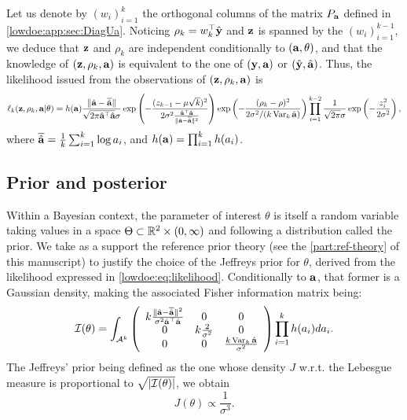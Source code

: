 Let us denote by $(w_i)_{i=1}^k$ the orthogonal columns of the matrix $P_{\mathbf{a}}$ defined in \cref{lowdoe:app:sec:DiagUa}. Noticing $\rho_k = w_k^{\top}\hat{\mathbf{y}}$ and $\mathbf{z}$ is spanned by the $(w_{i})_{i=1}^{k-1}$, we deduce that $\mathbf{z}$ and $\rho_k$ are independent conditionally to $(\mathbf{a}, \theta)$, and that the knowledge of $(\mathbf{z},\rho_k,\mathbf{a})$ is equivalent to the one of $(\mathbf{y},\mathbf{a})$ or $(\hat{\mathbf{y}},\hat{\mathbf{a}})$.
Thus, the likelihood issued from the observations of $(\mathbf{z}, \rho_k, \mathbf{a})$ is 
\begin{equation}\label{lowdoe:eq:likelihood}
     \ell_k(\mathbf{z},\rho_k,\mathbf{a}|\theta) = h(\mathbf{a})\frac{\|\hat{\mathbf{a}}-\overline{\hat{\mathbf{a}}}\|}{\sqrt{2\pi\hat{\mathbf{a}}^{\top}\hat{\mathbf{a}}}\sigma}\exp\left(-\frac{(z_{k-1}-\mu \sqrt{k})^2}{2\sigma^2\frac{\hat{\mathbf{a}}^{\top}\hat{\mathbf{a}}}{\|\hat{\mathbf{a}}-\overline{\hat{\mathbf{a}}}\|^2}}\right)\exp\left({-\frac{(\rho_k-\rho)^2}{2\sigma^2/(k\operatorname{Var}_k\hat{\mathbf{a}})}}\right)\prod_{i=1}^{k-2}\frac{1}{\sqrt{2\pi}\sigma}\exp\left(-\frac{z_i^2}{2\sigma^2}\right),
\end{equation}
where $\overline{\hat{\mathbf{a}}} = \frac{1}{k}\sum_{i=1}^k \log a_i$, and $h(\mathbf{a})=\prod_{i=1}^kh(a_i)$.


    \subsection{Prior and posterior}\label{lowdoe:sec:priorposterior}
%


Within a Bayesian context, the parameter of interest $\theta$ is itself a random variable taking values in a space $\Theta\subset\mathbb{R}^2\times(0,\infty)$ and following a distribution called the prior.
We take as a support the reference prior theory (see the \cref{part:ref-theory} of this manuscript) to justify the choice of the Jeffreys prior for $\theta$, derived from the likelihood expressed in \cref{lowdoe:eq:likelihood}.
Conditionally to $\mathbf{a}$, that former is a Gaussian density, making the associated Fisher information matrix being:
       \begin{equation}    
        \mathcal{I}(\theta) = \int_{\mathcal{A}^k}\left(\begin{array}{ccc}
             k\frac{\|\hat{\mathbf{a}} - \overline{\hat{\mathbf{a}}}\|^2}{\sigma^2\hat{\mathbf{a}}^{\top}\hat{\mathbf{a}}}&  0&0\\
             0&k\frac{2}{\sigma^2}&0 \\
             0&0& \frac{k\operatorname{Var}_k\hat{\mathbf{a}}}{\sigma^2}
        \end{array}\right) \prod_{i=1}^kh(a_i)d a_i.
    \end{equation}
The Jeffreys' prior being defined as the one whose density $J$ w.r.t.{ }the Lebesgue measure is proportional to $\sqrt{|\mathcal{I}(\theta)|}$, we obtain
\begin{equation}
    J(\theta)\propto \frac{1}{\sigma^3}.
\end{equation}


